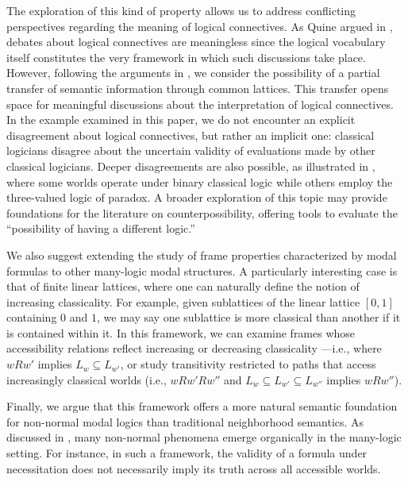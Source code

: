 \documentclass{amsart}
\begin{document}
The exploration of this kind of property allows us to address conflicting perspectives regarding the meaning of logical connectives. As Quine argued in \cite{quine_philosophy_1986}, debates about logical connectives are meaningless since the logical vocabulary itself constitutes the very framework in which such discussions take place. However, following the arguments in \cite{freire_modality_2024}, we consider the possibility of a partial transfer of semantic information through common lattices. This transfer opens space for meaningful discussions about the interpretation of logical connectives. In the example examined in this paper, we do not encounter an explicit disagreement about logical connectives, but rather an implicit one: classical logicians disagree about the uncertain validity of evaluations made by other classical logicians. Deeper disagreements are also possible, as illustrated in \cite{freire_modality_2024}, where some worlds operate under binary classical logic while others employ the three-valued logic of paradox. A broader exploration of this topic may provide foundations for the literature on counterpossibility, offering tools to evaluate the ``possibility of having a different logic.''

We also suggest extending the study of frame properties characterized by modal formulas to other many-logic modal structures. A particularly interesting case is that of finite linear lattices, where one can naturally define the notion of increasing classicality. For example, given sublattices of the linear lattice $[0,1]$ containing $0$ and $1$, we may say one sublattice is more classical than another if it is contained within it. In this framework, we can examine frames whose accessibility relations reflect increasing or decreasing classicality ---i.e., where $w R w'$ implies $L_w \subseteq L_{w'}$, or study transitivity restricted to paths that access increasingly classical worlds (i.e., $w R w' R w''$ and $L_w \subseteq L_{w'} \subseteq L_{w''}$ implies $w R w''$).

Finally, we argue that this framework offers a more natural semantic foundation for non-normal modal logics than traditional neighborhood semantics. As discussed in \cite{freire_modality_2024}, many non-normal phenomena emerge organically in the many-logic setting. For instance, in such a framework, the validity of a formula under necessitation does not necessarily imply its truth across all accessible worlds.

\medskip



\printbibliography
\end{document}
